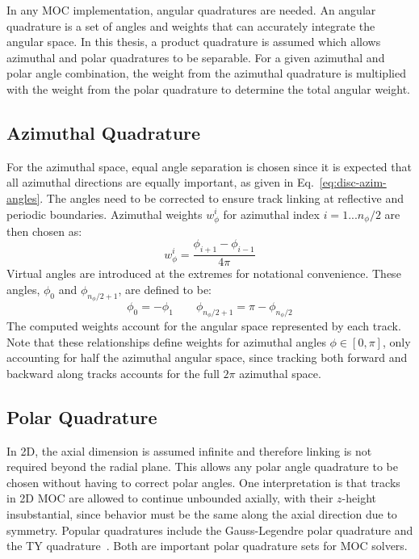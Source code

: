 In any \ac{MOC} implementation, angular quadratures are needed. An angular quadrature is a set of angles and weights that can accurately integrate the angular space. In this thesis, a product quadrature is assumed which allows azimuthal and polar quadratures to be separable. For a given azimuthal and polar angle combination, the weight from the azimuthal quadrature is multiplied with the weight from the polar quadrature to determine the total angular weight.

\subsection{Azimuthal Quadrature}

For the azimuthal space, equal angle separation is chosen since it is expected that all azimuthal directions are equally important, as given in Eq.~\ref{eq:disc-azim-angles}. The angles need to be corrected to ensure track linking at reflective and periodic boundaries. Azimuthal weights $w_{\phi}^i$ for azimuthal index $i=1...{n_\phi/2}$ are then chosen as:
\begin{equation}
w_{\phi}^i = \frac{\phi_{i+1} - \phi_{i-1}}{4\pi}
\end{equation}
Virtual angles are introduced at the extremes for notational convenience. These angles, $\phi_{0}$ and $\phi_{n_\phi/2+1}$, are defined to be:
\begin{equation}
\phi_0 = - \phi_1 \qquad \phi_{n_\phi/2+1} = \pi - \phi_{n_\phi/2}
\end{equation}
The computed weights account for the angular space represented by each track. Note that these relationships define weights for azimuthal angles $\phi \in [0, \pi]$, only accounting for half the azimuthal angular space, since tracking both forward and backward along tracks accounts for the full $2\pi$ azimuthal space.

\subsection{Polar Quadrature}

In 2D, the axial dimension is assumed infinite and therefore linking is not required beyond the radial plane. This allows any polar angle quadrature to be chosen without having to correct polar angles. One interpretation is that tracks in 2D \ac{MOC} are allowed to continue unbounded axially, with their $z$-height insubstantial, since behavior must be the same along the axial direction due to symmetry. Popular quadratures include the Gauss-Legendre polar quadrature and the TY quadrature~\cite{ty-quadrature}. Both are important polar quadrature sets for \ac{MOC} solvers.

